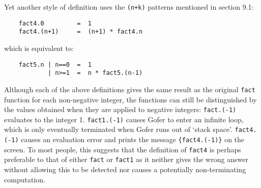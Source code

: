 Yet another style of definition uses the \verb=(n+k)=  patterns  mentioned  in
section 9.1:
\begin{verbatim}
    fact4.0         =  1
    fact4.(n+1)     =  (n+1) * fact4.n
\end{verbatim}
which is equivalent to:
\begin{verbatim}
    fact5.n | n==0  =  1
            | n>=1  =  n * fact5.(n-1)
\end{verbatim}
Although each of the above definitions gives the same  result
as the original \verb"fact" function  for  each  non-negative  integer,  the
functions can still be distinguished by the values obtained  when  they
are applied to negative integers:
\BSI
\IT  \verb"fact.(-1)" evaluates to the integer 1.
\IT  \verb"fact1.(-1)" causes Gofer to enter an infinite loop, which is only
     eventually terminated when Gofer runs out of `stack space'.
\IT  \verb"fact4.(-1)" causes an evaluation error and prints the
      message \verb"{fact4.(-1)}" on the screen.
\ESI
To most people, this suggests that the definition of \verb"fact4" is perhaps
preferable to that of either \verb"fact" or \verb"fact1" 
as it neither gives  the
wrong answer  without  allowing  this  to  be  detected  nor  causes  a
potentially non-terminating computation.


